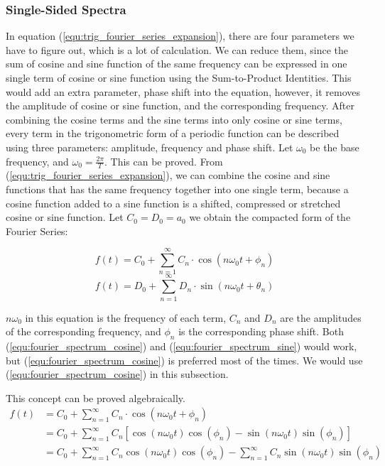 \subsubsection{Single-Sided Spectra}
In equation (\ref{equ:trig_fourier_series_expansion}), there are four parameters we have to figure out, 
which is a lot of calculation. We can reduce them, since the sum of cosine and sine function of the same frequency 
can be expressed in one single term of cosine or sine function using the Sum-to-Product Identities. 
This would add an extra parameter, phase shift into the equation, 
however, it removes the amplitude of cosine or sine function, and the corresponding frequency. 
After combining the cosine terms and the sine terms into only cosine or sine terms, 
every term in the trigonometric form of a periodic function can be described using 
three parameters: amplitude, frequency and phase shift. 
Let $\omega_0$ be the base frequency, and $\omega_0=\frac{2\pi}{T}$.
This can be proved. From (\ref{equ:trig_fourier_series_expansion}), 
we can combine the cosine and sine functions that has the same frequency together into one single term, 
because a cosine function added to a sine function is a shifted, compressed or stretched cosine or sine function.
Let $C_0 = D_0 = a_0$ we obtain the compacted form of the Fourier Series:

\begin{equation}
    f(t) =      C_0     +   \sum_{n=1}^{\infty} C_n \cdot \cos(n\omega_0t+\phi_n)
    \label{equ:fourier_spectrum_cosine}
\end{equation}
\begin{equation}
    f(t) =      D_0     +   \sum_{n=1}^{\infty} D_n \cdot \sin(n\omega_0t+\theta_n)
    \label{equ:fourier_spectrum_sine}
\end{equation}

$n\omega_0$ in this equation is the frequency of each term, 
$C_n$ and $D_n$ are the amplitudes of the corresponding frequency,
and $\phi_n$ is the corresponding phase shift. Both (\ref{equ:fourier_spectrum_cosine}) 
and (\ref{equ:fourier_spectrum_sine}) would work, 
but (\ref{equ:fourier_spectrum_cosine}) is preferred most of the times. 
We would use (\ref{equ:fourier_spectrum_cosine}) in this subsection.

This concept can be proved algebraically. 
$$\begin{aligned}
f(t) &= C_0  +  \sum_{n=1}^{\infty} C_n \cdot \cos(n\omega_0t+\phi_n)   \\
&= C_0  +  \sum_{n=1}^{\infty} C_n \left[ \cos(n\omega_0t)\cos(\phi_n) - \sin(n\omega_0t)\sin(\phi_n) \right]   \\
&= C_0  +  \sum_{n=1}^{\infty} C_n \cos(n\omega_0t)\cos(\phi_n) - \sum_{n=1}^{\infty} C_n \sin(n\omega_0t)\sin(\phi_n)
\end{aligned}$$

